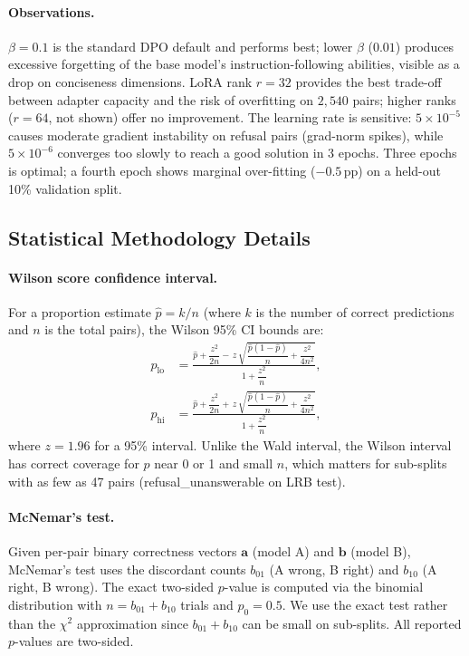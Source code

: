 \documentclass{article}
\theoremstyle{plain}
\theoremstyle{definition}
\theoremstyle{remark}
\begin{document}
\paragraph{Observations.}
$\beta\!=\!0.1$ is the standard DPO default and performs best; lower $\beta$ ($0.01$) produces excessive forgetting of the base model's instruction-following abilities, visible as a drop on conciseness dimensions.  LoRA rank $r\!=\!32$ provides the best trade-off between adapter capacity and the risk of overfitting on $2{,}540$ pairs; higher ranks ($r\!=\!64$, not shown) offer no improvement.  The learning rate is sensitive: $5\!\times\!10^{-5}$ causes moderate gradient instability on refusal pairs (grad-norm spikes), while $5\!\times\!10^{-6}$ converges too slowly to reach a good solution in 3 epochs.  Three epochs is optimal; a fourth epoch shows marginal over-fitting ($-0.5$\,pp) on a held-out 10\% validation split.


\subsection{Statistical Methodology Details}
\label{app:stats}

\paragraph{Wilson score confidence interval.}
For a proportion estimate $\hat{p} = k/n$ (where $k$ is the number of correct predictions and $n$ is the total pairs), the Wilson 95\% CI bounds are:
\begin{align*}
p_{\mathrm{lo}} &= \frac{\hat{p} + \dfrac{z^2}{2n} -\, z\,\sqrt{\dfrac{\hat{p}(1-\hat{p})}{n} + \dfrac{z^2}{4n^2}}}{1 + \dfrac{z^2}{n}}, \\[8pt]
p_{\mathrm{hi}} &= \frac{\hat{p} + \dfrac{z^2}{2n} +\, z\,\sqrt{\dfrac{\hat{p}(1-\hat{p})}{n} + \dfrac{z^2}{4n^2}}}{1 + \dfrac{z^2}{n}},
\end{align*}
where $z = 1.96$ for a 95\% interval.  Unlike the Wald interval, the Wilson interval has correct coverage for $p$ near 0 or 1 and small $n$, which matters for sub-splits with as few as 47 pairs (refusal\_unanswerable on LRB test).

\paragraph{McNemar's test.}
Given per-pair binary correctness vectors $\mathbf{a}$ (model A) and $\mathbf{b}$ (model B), McNemar's test uses the discordant counts $b_{01}$ (A wrong, B right) and $b_{10}$ (A right, B wrong).  The exact two-sided $p$-value is computed via the binomial distribution with $n = b_{01} + b_{10}$ trials and $p_0 = 0.5$.  We use the exact test rather than the $\chi^2$ approximation since $b_{01} + b_{10}$ can be small on sub-splits.  All reported $p$-values are two-sided.
\end{document}
